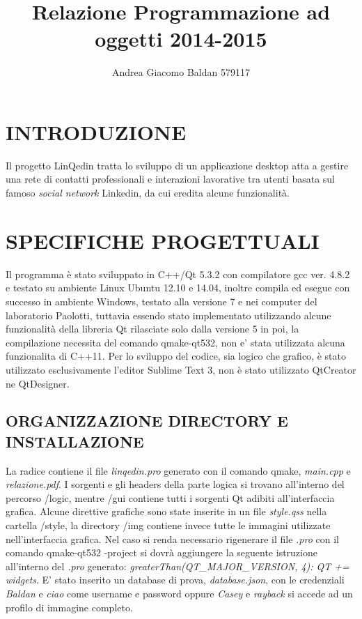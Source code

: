\documentclass[10pt,a4paper]{article}
\title{Relazione Programmazione ad oggetti 2014-2015}
\author{Andrea Giacomo Baldan 579117}
\begin{document}
\maketitle
\begingroup
\let\clearpage\relax
\section*{INTRODUZIONE}
Il progetto LinQedin tratta lo sviluppo di un applicazione desktop atta a gestire una rete di contatti professionali e interazioni lavorative tra utenti
basata sul famoso \textit{social network} Linkedin\textcopyright, da cui eredita alcune funzionalità.
\section*{SPECIFICHE PROGETTUALI}
Il programma è stato sviluppato in C++/Qt 5.3.2 con compilatore gcc ver. 4.8.2 e testato su ambiente Linux Ubuntu 12.10 e 14.04, inoltre compila ed esegue con successo in ambiente Windows, testato
alla versione 7 e nei computer del laboratorio Paolotti, tuttavia essendo stato implementato utilizzando alcune funzionalità della libreria Qt rilasciate solo dalla versione 5 in poi,
la compilazione necessita del comando qmake-qt532, non e' stata utilizzata alcuna funzionalita di C++11.
Per lo sviluppo del codice, sia logico che grafico, è stato utilizzato esclusivamente l'editor Sublime Text 3, non è stato utilizzato QtCreator ne QtDesigner.
\subsection*{ORGANIZZAZIONE DIRECTORY E INSTALLAZIONE}
La radice contiene il file \textit{linqedin.pro} generato con il comando qmake, \textit{main.cpp} e \textit{relazione.pdf}.
I sorgenti e gli headers della parte logica si trovano all'interno del percorso /logic, mentre /gui contiene tutti i sorgenti Qt adibiti all'interfaccia grafica.
Alcune direttive grafiche sono state inserite in un file \textit{style.qss} nella cartella /style, la directory /img contiene invece tutte le immagini utilizzate nell'interfaccia grafica.
Nel caso si renda necessario rigenerare il file \textit{.pro} con il comando qmake-qt532 -project si dovrà aggiungere la seguente istruzione all'interno del \textit{.pro} generato: \textit{greaterThan(QT\_MAJOR\_VERSION, 4): QT += widgets}. E' stato inserito un database di prova, \textit{database.json}, con le credenziali \textit{Baldan} e \textit{ciao} come username e password oppure \textit{Casey} e \textit{rayback} si accede ad un profilo di immagine completo.





\endgroup
\end{document}

